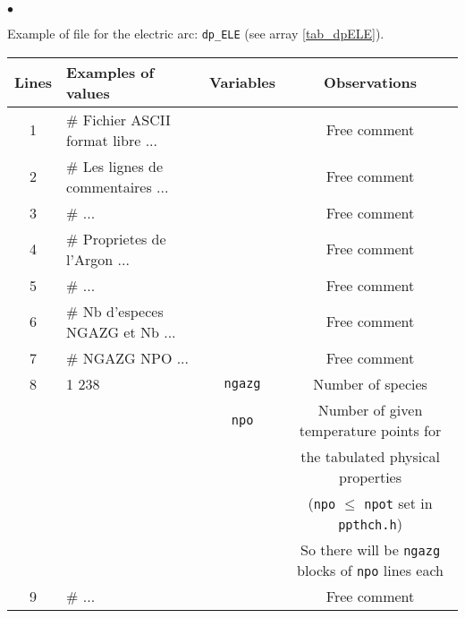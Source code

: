 {{{\begin{list}{$\bullet$}{}
       \item Example of file for the electric arc: \texttt{dp\_ELE} (see
             array \ref{tab_dpELE}).

\begin{table}[htbp]
\begin{center}
\small{
\begin{tabular}{|c|l|c|c|} \hline
 Lines  &        Examples of values        & Variables & Observations                                       \\ \hline
  1     &\# Fichier ASCII format libre ... &           & Free comment                                       \\ \hline
  2     &\# Les lignes de commentaires ... &           & Free comment                                       \\ \hline
  3     &\#                            ... &           & Free comment                                       \\ \hline
  4     &\#   Proprietes de l'Argon    ... &           & Free comment                                       \\ \hline
  5     &\#                            ... &           & Free comment                                       \\ \hline
  6     &\# Nb d'especes NGAZG et Nb   ... &           & Free comment                                       \\ \hline
  7     &\# NGAZG NPO                  ... &           & Free comment                                       \\ \hline
  8     &    1   238         &    \texttt{ngazg\index{ngazg}}   & Number of species                         \\
        &                    &    \texttt{npo\index{npo}}       & Number of given temperature points for    \\
        &                    &                         & the tabulated physical properties                  \\
        &                    &                         & (\texttt{npo} $\leqslant$ \texttt{npot} set in \texttt{ppthch.h})             \\
        &                    &                         & So there will be \texttt{ngazg} blocks of \texttt{npo} lines each    \\ \hline
  9     &\#                            ... &           & Free comment                                       \\ \hline

\end{tabular}}
\end{center}
\end{table}
\end{list}}}}
